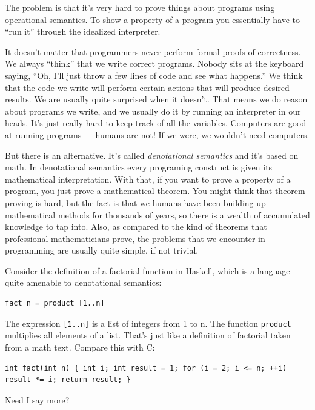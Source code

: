 The problem is that it's very hard to prove things about programs using
operational semantics. To show a property of a program you essentially
have to ``run it'' through the idealized interpreter.

It doesn't matter that programmers never perform formal proofs of
correctness. We always ``think'' that we write correct programs. Nobody
sits at the keyboard saying, ``Oh, I'll just throw a few lines of code
and see what happens.'' We think that the code we write will perform
certain actions that will produce desired results. We are usually quite
surprised when it doesn't. That means we do reason about programs we
write, and we usually do it by running an interpreter in our heads. It's
just really hard to keep track of all the variables. Computers are good
at running programs --- humans are not! If we were, we wouldn't need
computers.

But there is an alternative. It's called \emph{denotational semantics}
and it's based on math. In denotational semantics every programing
construct is given its mathematical interpretation. With that, if you
want to prove a property of a program, you just prove a mathematical
theorem. You might think that theorem proving is hard, but the fact is
that we humans have been building up mathematical methods for thousands
of years, so there is a wealth of accumulated knowledge to tap into.
Also, as compared to the kind of theorems that professional
mathematicians prove, the problems that we encounter in programming are
usually quite simple, if not trivial.

Consider the definition of a factorial function in Haskell, which is a
language quite amenable to denotational semantics:

\begin{verbatim}
fact n = product [1..n]
\end{verbatim}

The expression \texttt{{[}1..n{]}} is a list of integers from 1 to n.
The function \texttt{product} multiplies all elements of a list. That's
just like a definition of factorial taken from a math text. Compare this
with C:

\begin{verbatim}
int fact(int n) { int i; int result = 1; for (i = 2; i <= n; ++i) result *= i; return result; }
\end{verbatim}

Need I say more?

